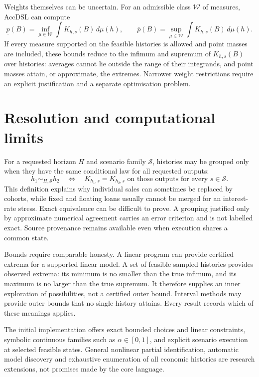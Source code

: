 Weights themselves can be uncertain. For an admissible class $\mathcal{W}$
of measures, AccDSL can compute
\[
 \underline p(B)=\inf_{\mu\in\mathcal{W}}\int K_{h,s}(B)\,d\mu(h),
 \qquad
 \overline p(B)=\sup_{\mu\in\mathcal{W}}\int K_{h,s}(B)\,d\mu(h).
\]
If every measure supported on the feasible histories is allowed and point
masses are included, these bounds reduce to the infimum and supremum of
$K_{h,s}(B)$ over histories: averages cannot lie outside the range of their
integrands, and point masses attain, or approximate, the extremes. Narrower
weight restrictions require an explicit justification and a separate
optimisation problem.

\section{Resolution and computational limits}

For a requested horizon $H$ and scenario family $\mathcal{S}$, histories may be
grouped only when they have the same conditional law for all requested
outputs:
\[
 h_1\sim_{H,\mathcal{S}}h_2
 \quad\Longleftrightarrow\quad
 K_{h_1,s}=K_{h_2,s}\text{ on those outputs for every }s\in\mathcal{S}.
\]
This definition explains why individual sales can sometimes be replaced by
cohorts, while fixed and floating loans usually cannot be merged for an
interest-rate stress. Exact equivalence can be difficult to prove. A grouping
justified only by approximate numerical agreement carries an error criterion
and is not labelled exact. Source provenance remains available even when
execution shares a common state.

Bounds require comparable honesty. A linear program can provide certified
extrema for a supported linear model. A set of feasible sampled histories
provides observed extrema: its minimum is no smaller than the true infimum,
and its maximum is no larger than the true supremum. It therefore supplies
an inner exploration of possibilities, not a certified outer bound. Interval
methods may provide outer bounds that no single history attains. Every result
records which of these meanings applies.

The initial implementation offers exact bounded choices and linear constraints,
symbolic continuous families such as $\alpha\in[0,1]$, and explicit scenario
execution at selected feasible states. General nonlinear partial identification,
automatic model discovery and exhaustive enumeration of all economic histories
are research extensions, not promises made by the core language.

